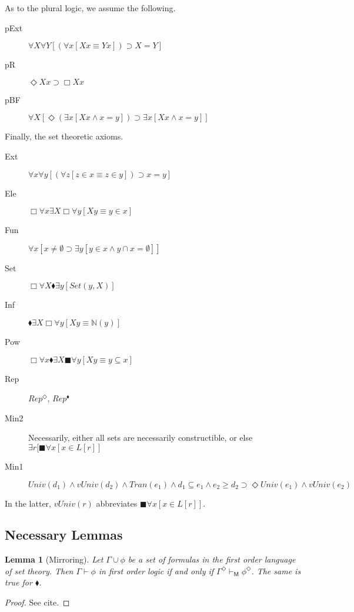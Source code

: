 \documentclass{article}
\newcommand\D{\blacklozenge}
\newcommand\B{\blacksquare}
\newtheorem{lemma}{Lemma}
\begin{document}
As to the plural logic, we assume the following.
\begin{description}
    \item[pExt] $\forall X \forall Y [(\forall x[Xx \equiv Yx]) \supset X = Y]$
    \item[pR] $ \Diamond Xx \supset \Box Xx$
    \item[pBF] $\forall X[ \Diamond (\exists x[Xx \wedge x = y]) \supset \exists x [Xx \wedge x = y]]$
\end{description}
Finally, the set theoretic axioms.
\begin{description}
    \item[Ext] $\forall x \forall y [(\forall z[z \in x \equiv z \in y]) \supset x = y]$
    \item[Ele] $\Box \forall x \exists X \Box \forall y[Xy \equiv y \in x]$
    \item[Fun] $\forall x[ x \not = \emptyset \supset \exists y[y \in x \wedge y \cap x = \emptyset]]$
    \item[Set] $\Box \forall X \D \exists y [Set(y, X)]$
    \item[Inf] $\D \exists X\Box \forall y[Xy \equiv \mathbb{N}(y)]$
    \item[Pow] $\Box \forall x \D \exists X \B \forall y [Xy \equiv y \subseteq x]$
    \item[Rep] $Rep^\Diamond$, $Rep^\D$
    \item[Min2] Necessarily, either all sets are necessarily constructible, or else $\exists r[\B \forall x[x \in L[r]]$
    \item[Min1] $Univ(d_1) \wedge vUniv(d_2) \wedge Tran(e_1) \wedge d_1 \subseteq e_1 \wedge e_2 \geq d_2 \supset \Diamond Univ(e_1) \wedge vUniv(e_2)$ 
\end{description}
In the latter, $vUniv(r)$ abbreviates $\B \forall x [x \in L[r]]$.
\subsection{Necessary Lemmas}
\begin{lemma}[Mirroring]
    Let $\Gamma 
    \cup {\phi}$ be a set of formulas in the first order language of set theory. Then
    $\Gamma \vdash \phi$ in first order logic if and only if 
    $\Gamma^\Diamond \vdash_\mathsf{M} \phi^\Diamond$. 
    The same is true for $\D$.
\end{lemma}
\begin{proof}
    See cite.
\end{proof}
\end{document}
